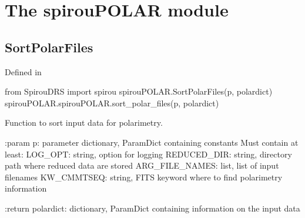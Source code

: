 \clearpage
\newpage
\noindent\begin{minipage}{\textwidth}
\section{The spirouPOLAR module}
\label{ch:the_module:spirouPOLAR}

\subsection{SortPolarFiles}

Defined in \spirouPOLAR{}

\begin{pythonbox}
from SpirouDRS import spirou
spirouPOLAR.SortPolarFiles(p, polardict)
spirouPOLAR.spirouPOLAR.sort_polar_files(p, polardict)
\end{pythonbox}

\begin{pythondocstring}
Function to sort input data for polarimetry.
    
:param p: parameter dictionary, ParamDict containing constants
    Must contain at least:
        LOG_OPT: string, option for logging
        REDUCED_DIR: string, directory path where reduced data are stored
        ARG_FILE_NAMES: list, list of input filenames
        KW_CMMTSEQ: string, FITS keyword where to find polarimetry 
                    information

:return polardict: dictionary, ParamDict containing information on the
                   input data
\end{pythondocstring}
\end{minipage}


